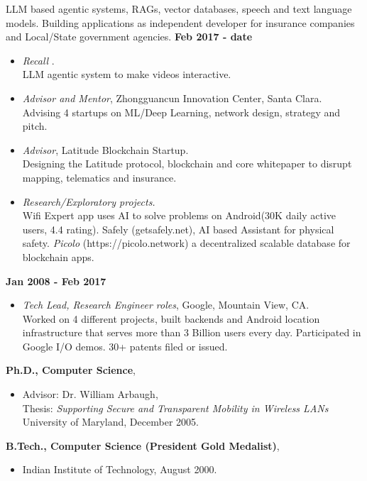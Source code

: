 \begin{resume}
\vspace{0.1in}

LLM based agentic systems, RAGs, vector databases, speech and text language models. Building applications as independent developer for insurance companies and Local/State government agencies.
{\bf Feb 2017 - date}
    \begin{itemize}
        \item [] {\it Recall }. \\
            LLM agentic system to make videos interactive.
        \item [] {\it Advisor and Mentor}, Zhongguancun Innovation Center, Santa Clara. \\
            Advising 4 startups on ML/Deep Learning, network design, strategy and pitch.
        \item [] {\it Advisor}, Latitude Blockchain Startup. \\ 
            Designing the Latitude protocol, blockchain and core whitepaper to disrupt mapping, telematics and insurance.
        \item [] {\it Research/Exploratory projects.} \\
            Wifi Expert app uses AI to solve problems on Android(30K daily active users, 4.4 rating).
            Safely (getsafely.net), AI based Assistant for physical safety. {\em Picolo} (https://picolo.network) a decentralized scalable database for blockchain apps.
    \end{itemize}

{\bf Jan 2008 - Feb 2017}
    \begin{itemize}
         \item[] {\it Tech Lead, Research Engineer roles}, Google, Mountain View, CA.\\
             Worked on 4 different projects, built backends and Android location infrastructure that serves more than 3
             Billion users every day. Participated in Google I/O demos. 30+ patents filed or issued.
    \end{itemize}

{\bf Ph.D., Computer Science},
    \begin{itemize}
         \item[] Advisor: Dr. William Arbaugh, \\
		 Thesis: {\em Supporting Secure and Transparent Mobility in Wireless LANs} \\
                 University of Maryland, December 2005.
    \end{itemize}
{\bf B.Tech., Computer Science (President Gold Medalist)},
    \begin{itemize}
        \item[] Indian Institute of Technology, August 2000.
    \end{itemize}


\end{resume}
